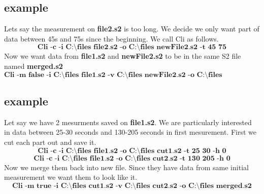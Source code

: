 \documentclass[english]{article}
\begin{document}
\subsection{example}
Lets say the measurement on \textbf{file2.s2} is too long. We decide we only want part of data between 45s and 75s since the beginning. We call Cli as follows.
$$ \textbf{Cli -c -i C:\textbackslash files file2.s2 -o C:\textbackslash files newFile2.s2 -t 45 75}$$
Now we want data from \textbf{file1.s2} and \textbf{newFile2.s2} to be in the same S2 file named \textbf{merged.s2}
$$ \textbf{Cli -m false -i C:\textbackslash files file1.s2 -v C:\textbackslash files newFile2.s2 -o C:\textbackslash files merged.s2}$$


\subsection{example}
Let say we have 2 mesurments saved on \textbf{file1.s2}. We are particularly interested in data between 25-30 seconds and 130-205 seconds in first mesurement. First we cut each part out and save it. 
$$ \textbf{Cli -c -i C:\textbackslash files file1.s2 -o C:\textbackslash files cut1.s2 -t 25 30 -h 0}    $$
$$ \textbf{Cli -c -i C:\textbackslash files file1.s2 -o C:\textbackslash files cut2.s2 -t 130 205 -h 0}$$
Now we merge them back into new file. Since they have data from same initial measurement we want them to look like it.
$$ \textbf{Cli -m true -i C:\textbackslash files cut1.s2 -v C:\textbackslash files cut2.s2 -o C:\textbackslash files merged.s2}$$
\end{document}
